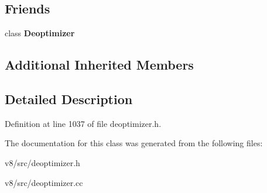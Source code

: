 \subsection*{Friends}
\begin{DoxyCompactItemize}
\item 
\mbox{\label{classv8_1_1internal_1_1DeoptimizedFrameInfo_aa89911581cd6ded032f998021aef9e5c}} 
class {\bfseries Deoptimizer}
\end{DoxyCompactItemize}
\subsection*{Additional Inherited Members}


\subsection{Detailed Description}


Definition at line 1037 of file deoptimizer.\+h.



The documentation for this class was generated from the following files\+:\begin{DoxyCompactItemize}
\item 
v8/src/deoptimizer.\+h\item 
v8/src/deoptimizer.\+cc\end{DoxyCompactItemize}
